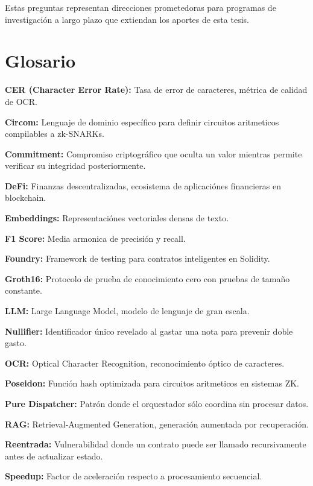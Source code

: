 \documentclass[12pt,a4paper,twoside]{book}
\begin{document}
Estas preguntas representan direcciones prometedoras para programas de investigación a largo plazo que extiendan los aportes de esta tesis.

\appendix
\chapter{Glosario}

\textbf{CER (Character Error Rate):} Tasa de error de caracteres, métrica de calidad de OCR.

\textbf{Circom:} Lenguaje de dominio específico para definir circuitos aritmeticos compilables a zk-SNARKs.

\textbf{Commitment:} Compromiso criptográfico que oculta un valor mientras permite verificar su integridad posteriormente.

\textbf{DeFi:} Finanzas descentralizadas, ecosistema de aplicaciónes financieras en blockchain.

\textbf{Embeddings:} Representaciónes vectoriales densas de texto.

\textbf{F1 Score:} Media armonica de precisión y recall.

\textbf{Foundry:} Framework de testing para contratos inteligentes en Solidity.

\textbf{Groth16:} Protocolo de prueba de conocimiento cero con pruebas de tamaño constante.

\textbf{LLM:} Large Language Model, modelo de lenguaje de gran escala.

\textbf{Nullifier:} Identificador único revelado al gastar una nota para prevenir doble gasto.

\textbf{OCR:} Optical Character Recognition, reconocimiento óptico de caracteres.

\textbf{Poseidon:} Función hash optimizada para circuitos aritmeticos en sistemas ZK.

\textbf{Pure Dispatcher:} Patrón donde el orquestador sólo coordina sin procesar datos.

\textbf{RAG:} Retrieval-Augmented Generation, generación aumentada por recuperación.

\textbf{Reentrada:} Vulnerabilidad donde un contrato puede ser llamado recursivamente antes de actualizar estado.

\textbf{Speedup:} Factor de aceleración respecto a procesamiento secuencial.
\end{document}
